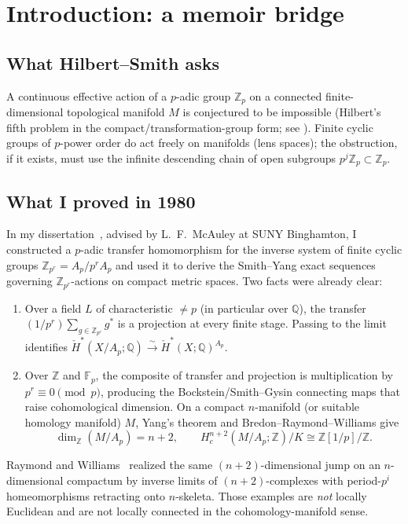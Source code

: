 \documentclass[11pt]{article}
\theoremstyle{definition}
\begin{document}
\section{Introduction: a memoir bridge}
\label{sec:intro}

\subsection{What Hilbert--Smith asks}
A continuous effective action of a $p$-adic group $\mathbb{Z}_p$ on a connected
finite-dimensional topological manifold $M$ is conjectured to be impossible
(Hilbert's fifth problem in the compact/transformation-group form; see
\cite{newman1931,smith1941,yang1960}).  Finite cyclic groups of $p$-power order
do act freely on manifolds (lens spaces); the obstruction, if it exists, must
use the infinite descending chain of open subgroups
$p^j\mathbb{Z}_p\subset\mathbb{Z}_p$.

\subsection{What I proved in 1980}
In my dissertation~\cite{coppola1980}, advised by L.~F.\ McAuley at SUNY
Binghamton, I constructed a $p$-adic transfer homomorphism for the inverse
system of finite cyclic groups $\mathbb{Z}_{p^r}=A_p/p^r A_p$ and used it to
derive the Smith--Yang exact sequences governing $\mathbb{Z}_{p^r}$-actions on
compact metric spaces.  Two facts were already clear:
\begin{enumerate}[label=(\alph*)]
\item Over a field $L$ of characteristic $\neq p$ (in particular over
$\mathbb{Q}$), the transfer $(1/p^r)\sum_{g\in\mathbb{Z}_{p^r}}g^*$ is a
projection at every finite stage.  Passing to the limit identifies
$\check{H}^*(X/A_p;\mathbb{Q})\xrightarrow{\sim}\check{H}^*(X;\mathbb{Q})^{A_p}$.
\item Over $\mathbb{Z}$ and $\mathbb{F}_p$, the composite of transfer and
projection is multiplication by $p^r\equiv 0\pmod{p}$, producing the
Bockstein/Smith--Gysin connecting maps that raise cohomological dimension.
On a compact $n$-manifold (or suitable homology manifold) $M$, Yang's theorem
and Bredon--Raymond--Williams give
\[
\dim_{\mathbb{Z}}(M/A_p)=n+2,\qquad
H^{n+2}_c(M/A_p;\mathbb{Z})/K\cong\mathbb{Z}[1/p]/\mathbb{Z}.
\]
\end{enumerate}
Raymond and Williams~\cite{raymondwilliams1960,raymondwilliams1963} realized the
same $(n+2)$-dimensional jump on an $n$-dimensional compactum by inverse limits
of $(n+2)$-complexes with period-$p^i$ homeomorphisms retracting onto
$n$-skeleta.  Those examples are \emph{not} locally Euclidean and are not
locally connected in the cohomology-manifold sense.
\end{document}
